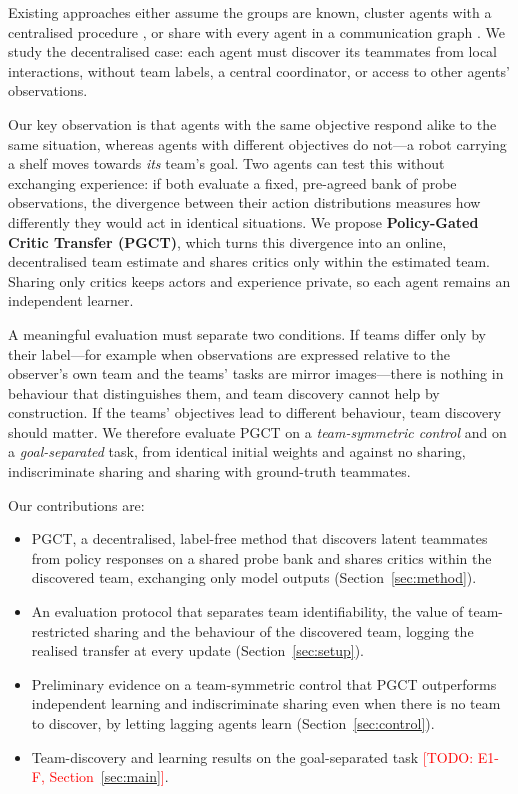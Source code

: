 \documentclass{article}
\newcommand{\todo}[1]{\textcolor{red}{[TODO: #1]}}
\newcommand{\ours}{PGCT}
\begin{document}
Existing approaches either assume the groups are known, cluster agents with a centralised procedure
\cite{christianos2021seps,hu2025heterogeneity}, or share with every agent in a communication graph
\cite{zhang2018networked}. We study the decentralised case: each agent must discover its teammates from local
interactions, without team labels, a central coordinator, or access to other agents' observations.

Our key observation is that agents with the same objective respond alike to the same situation, whereas agents with
different objectives do not---a robot carrying a shelf moves towards \emph{its} team's goal. Two agents can test this
without exchanging experience: if both evaluate a fixed, pre-agreed bank of probe observations, the divergence
between their action distributions measures how differently they would act in identical situations. We propose
\textbf{Policy-Gated Critic Transfer (\ours{})}, which turns this divergence into an online, decentralised team
estimate and shares critics only within the estimated team. Sharing only critics keeps actors and experience private,
so each agent remains an independent learner.

A meaningful evaluation must separate two conditions. If teams differ only by their label---for example when
observations are expressed relative to the observer's own team and the teams' tasks are mirror images---there is
nothing in behaviour that distinguishes them, and team discovery cannot help by construction. If the teams' objectives
lead to different behaviour, team discovery should matter. We therefore evaluate \ours{} on a \emph{team-symmetric
control} and on a \emph{goal-separated} task, from identical initial weights and against no sharing, indiscriminate
sharing and sharing with ground-truth teammates.

Our contributions are:
\begin{itemize}
  \item \ours{}, a decentralised, label-free method that discovers latent teammates from policy responses on a shared
    probe bank and shares critics within the discovered team, exchanging only model outputs
    (Section~\ref{sec:method}).
  \item An evaluation protocol that separates team identifiability, the value of team-restricted sharing and the
    behaviour of the discovered team, logging the realised transfer at every update (Section~\ref{sec:setup}).
  \item Preliminary evidence on a team-symmetric control that \ours{} outperforms independent learning and
    indiscriminate sharing even when there is no team to discover, by letting lagging agents learn
    (Section~\ref{sec:control}).
  \item Team-discovery and learning results on the goal-separated task \todo{E1-F, Section~\ref{sec:main}}.
\end{itemize}
\end{document}
